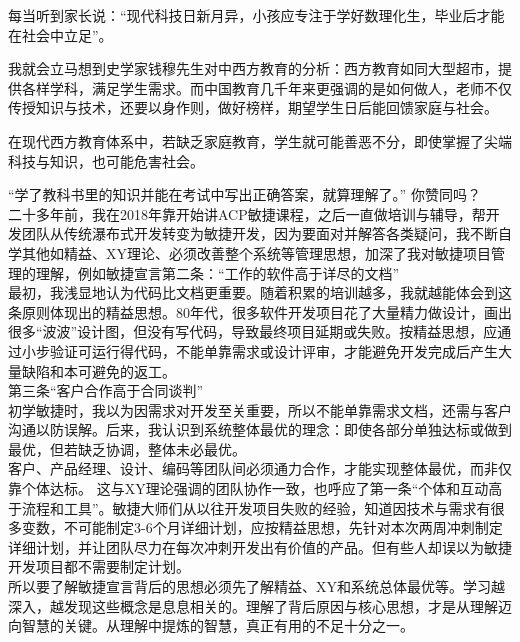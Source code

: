 \newpage

每当听到家长说：``现代科技日新月异，小孩应专注于学好数理化生，毕业后才能在社会中立足''。

我就会立马想到史学家钱穆先生对中西方教育的分析：西方教育如同大型超市，提供各样学科，满足学生需求。而中国教育几千年来更强调的是如何做人，老师不仅传授知识与技术，还要以身作则，做好榜样，期望学生日后能回馈家庭与社会。

在现代西方教育体系中，若缺乏家庭教育，学生就可能善恶不分，即使掌握了尖端科技与知识，也可能危害社会。

``学了教科书里的知识并能在考试中写出正确答案，就算理解了。''
你赞同吗？\\
二十多年前，我在2018年靠开始讲ACP敏捷课程，之后一直做培训与辅导，帮开发团队从传统瀑布式开发转变为敏捷开发，因为要面对并解答各类疑问，我不断自学其他如精益、XY理论、必须改善整个系统等管理思想，加深了我对敏捷项目管理的理解，例如敏捷宣言第二条：``工作的软件高于详尽的文档''\\
最初，我浅显地认为代码比文档更重要。随着积累的培训越多，我就越能体会到这条原则体现出的精益思想。80年代，很多软件开发项目花了大量精力做设计，画出很多``波波''设计图，但没有写代码，导致最终项目延期或失败。按精益思想，应通过小步验证可运行得代码，不能单靠需求或设计评审，才能避免开发完成后产生大量缺陷和本可避免的返工。\\
第三条``客户合作高于合同谈判''\\
初学敏捷时，我以为因需求对开发至关重要，所以不能单靠需求文档，还需与客户沟通以防误解。后来，我认识到系统整体最优的理念：即使各部分单独达标或做到最优，但若缺乏协调，整体未必最优。\\
客户、产品经理、设计、编码等团队间必须通力合作，才能实现整体最优，而非仅靠个体达标。
这与XY理论强调的团队协作一致，也呼应了第一条``个体和互动高于流程和工具''。敏捷大师们从以往开发项目失败的经验，知道因技术与需求有很多变数，不可能制定3-6个月详细计划，应按精益思想，先针对本次两周冲刺制定详细计划，并让团队尽力在每次冲刺开发出有价值的产品。但有些人却误以为敏捷开发项目都不需要制定计划。\\
所以要了解敏捷宣言背后的思想必须先了解精益、XY和系统总体最优等。学习越深入，越发现这些概念是息息相关的。理解了背后原因与核心思想，才是从理解迈向智慧的关键。从理解中提炼的智慧，真正有用的不足十分之一。



